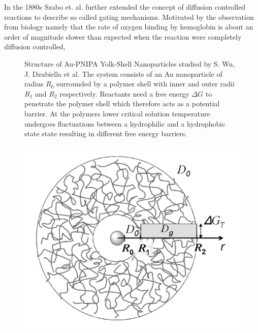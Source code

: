 In the 1880s Szabo et. al. \cite{Szabo1982} further extended the concept of diffusion controlled reactions to describe so called gating mechanisms. Motivated by the observation from biology namely that the rate of oxygen binding by hemoglobin is about an order of magnitude slower than expected when the reaction were completely diffusion controlled,\vspace{-1 cm}  \\

\begin{minipage}[t]{0.62 \textwidth}
    \begin{figure}[H]
        \caption{Structure of Au-PNIPA Yolk-Shell Nanoparticles studied by S. Wu, J. Dzubiella et al. The system consists of an Au nanoparticle of radius $R_0$ surrounded by a polymer shell with inner and outer radii $R_1$ and $R_2$ respectively. Reactants need a free energy $\Delta G$ to penetrate the polymer shell which therefore acts as a potential barrier. At the polymers lower critical solution temperature undergoes fluctuations between a hydrophilic and a hydrophobic state state resulting in different free energy barriers.}\label{PNIPA}
    \end{figure}
\end{minipage}\begin{minipage}[t]{0.38 \textwidth}
    \begin{figure}[H]
         \includegraphics[width = 1.1 \textwidth]{plots/PNIPA.png}
    \end{figure}
\end{minipage}
